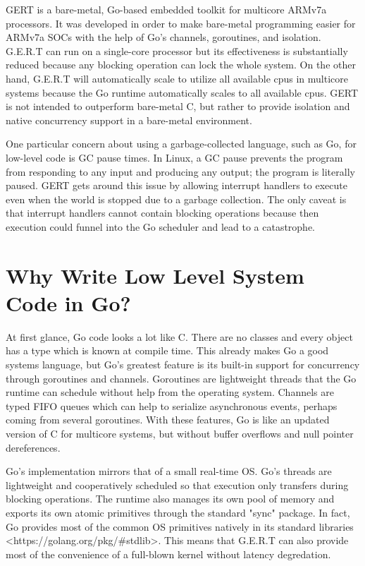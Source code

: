 GERT is a bare-metal, Go-based embedded toolkit for multicore ARMv7a processors.
It was developed in order to make bare-metal programming
easier for ARMv7a SOCs with the help of Go's channels, goroutines, and isolation.
G.E.R.T can run on a single-core processor but its effectiveness is substantially
reduced because any blocking operation can lock the whole system. On the other hand,
G.E.R.T will automatically scale to utilize all available cpus in multicore systems
because the Go runtime automatically scales to all available cpus. GERT is not intended
to outperform bare-metal C, but rather to provide isolation and native concurrency
support in a bare-metal environment.

One particular concern about using a garbage-collected language, such as Go,
for low-level code is GC pause times. In Linux, a GC pause prevents the program from
responding to any input and producing any output; the program is literally paused.
GERT gets around this issue by allowing interrupt handlers to execute even when the
world is stopped due to a garbage collection. The only caveat is that interrupt handlers
cannot contain blocking operations because then execution could funnel into the Go scheduler
and lead to a catastrophe.

\section{Why Write Low Level System Code in Go?}

At first glance, Go code looks a lot like C. There are no
classes and every object has a type which is known at compile time.
This already makes Go a good systems language, but Go's
greatest feature is its built-in support for concurrency through
goroutines and channels. Goroutines are lightweight threads that
the Go runtime can schedule without help from the operating system.
Channels are typed FIFO queues which can help to serialize
asynchronous events, perhaps coming from several goroutines.
With these features, Go is like an updated version
of C for multicore systems, but without buffer overflows and
null pointer dereferences.

Go's implementation mirrors that of a small
real-time OS. Go's threads are lightweight and
cooperatively scheduled so that execution only transfers during
blocking operations. The runtime also manages its own pool of memory
and exports its own atomic primitives through the standard "sync"
package. In fact, Go provides most of the common OS primitives natively
in its standard libraries <https://golang.org/pkg/\#stdlib>. This means
that G.E.R.T can also provide most of the convenience of a full-blown kernel
without latency degredation.

